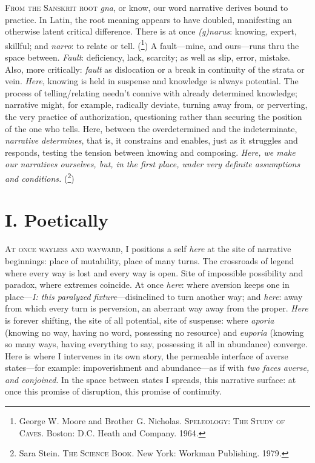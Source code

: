 \documentclass[
]{memoir}
\begin{document}
\textsc{From the Sanskrit root} \emph{gna}, or know, our word narrative
derives bound to practice. In Latin, the root meaning appears to have
doubled, manifesting an otherwise latent critical difference. There is
at once \emph{(g)narus}: knowing, expert, skillful; and \emph{narro}: to
relate or tell. (\footnote{George W. Moore and Brother G. Nicholas.
  \textsc{Speleology: The Study of Caves}. Boston: D.C. Heath and
  Company. 1964.}) A fault---mine, and ours---runs thru the space
between. \emph{Fault}: deficiency, lack, scarcity; as well as slip,
error, mistake. Also, more critically: \emph{fault} as dislocation or a
break in continuity of the strata or vein. \emph{Here}, knowing is held
in suspense and knowledge is always potential. The process of
telling/relating needn't connive with already determined knowledge;
narrative might, for example, radically deviate, turning away from, or
perverting, the very practice of authorization, questioning rather than
securing the position of the one who tells. Here, between the
overdetermined and the indeterminate, \emph{narrative determines}, that
is, it constrains and enables, just as it struggles and responds,
testing the tension between knowing and composing. \emph{Here, we make
our narratives ourselves, but, in the first place, under very definite
assumptions and conditions.} (\footnote{Sara Stein. \textsc{The Science
  Book}. New York: Workman Publishing. 1979.})

\hypertarget{i.-poetically}{%
\section*{I. Poetically}\label{i.-poetically}}

\textsc{At once wayless and wayward}, I positions a self \emph{here} at
the site of narrative beginnings: place of mutability, place of many
turns. The crossroads of legend where every way is lost and every way is
open. Site of impossible possibility and paradox, where extremes
coincide. At once \emph{here}: where aversion keeps one in
place---\emph{I: this paralyzed fixture}---disinclined to turn another
way; and \emph{here}: away from which every turn is perversion, an
aberrant way away from the proper. \emph{Here} is forever shifting, the
site of all potential, site of suspense: where \emph{aporia} (knowing no
way, having no word, possessing no resource) and \emph{euporia} (knowing
so many ways, having everything to say, possessing it all in abundance)
converge. Here is where I intervenes in its own story, the permeable
interface of averse states---for example: impoverishment and
abundance---as if with \emph{two faces averse, and conjoined}. In the
space between states I spreads, this narrative surface: at once this
promise of disruption, this promise of continuity.
\end{document}
